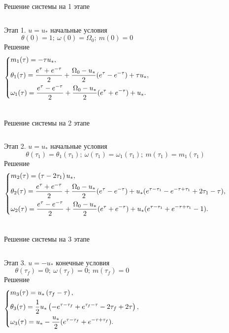 \documentclass[10pt]{beamer}
\begin{document}
\begin{frame}{Решение системы на 1 этапе}
	\begin{columns}
		Этап 1. $u=u_*$ начальные условия
		\[
			\theta(0)=1;\ \omega(0)=\Omega_0;\ m(0)=0
		\]
		Решение
		\[
			\left\{ {\begin{aligned}
						 & m_1(\tau) = -\tau  u_*, \hfill                                                                         \\
						 & \theta_1(\tau) = \frac{e^\tau+e^{-\tau}}{2}+\frac{\Omega_0-u_*}{2}(e^\tau-e^{-\tau})+\tau u_* , \hfill \\
						 & \omega_1(\tau) =\frac{e^\tau-e^{-\tau}}{2}+\frac{\Omega_0-u_*}{2}(e^\tau+e^{-\tau})+u_*   . \hfill     \\
					\end{aligned}} \right.
		\]
	\end{columns}
\end{frame}
\begin{frame}{Решение системы на 2 этапе}
	\begin{columns}
		\column{1\textwidth}
		Этап 2. $u=u_*$ начальные условия
		\[
			\theta(\tau_1)=\theta_1(\tau_1);\ \omega(\tau_1)=\omega_1(\tau_1);\ m(\tau_1)=m_1(\tau_1)
		\]
		Решение
		\[
			\left\{ {\begin{aligned}
						 & m_2(\tau) = \left(\tau -2 \tau _1\right) u_*, \hfill                                                                                                \\
						 & \theta_2(\tau) = \frac{e^\tau+e^{-\tau}}{2}+\frac{\Omega_0-u_\ast}{2}(e^\tau-e^{-\tau})+u_*(e^{\tau-\tau_1}-e^{-\tau+\tau_1}+2\tau_1-\tau) , \hfill \\
						 & \omega_2(\tau) = \frac{e^\tau-e^{-\tau}}{2}+\frac{\Omega_0-u_\ast}{2}(e^\tau+e^{-\tau})+u_*(e^{\tau-\tau_1}+e^{-\tau+\tau_1}-1) . \hfill            \\
					\end{aligned}} \right.
		\]
	\end{columns}
\end{frame}
\begin{frame}{Решение системы на 3 этапе}
	\begin{columns}
		Этап 3. $u=-u_*$ конечные условия
		\[
			\theta(\tau_f)=0;\ \omega(\tau_f)=0;\ m(\tau_f)=0
		\]
		Решение
		\[
			\left\{ {\begin{aligned}
						 & m_3(\tau) = u_* \left(\tau _f-\tau \right), \hfill                                           \\
						 & \theta_3(\tau) = \frac{1}{2} u_* \left(-e^{\tau -\tau _f}+e^{\tau _f-\tau }-2 \tau _f+2 \tau
						\right), \hfill                                                                                 \\
						 & \omega_3(\tau) =u_*-\frac{u_*}{2}(e^{\tau-\tau_f}+e^{-\tau+\tau_f}) . \hfill                 \\
					\end{aligned}} \right.
		\]
	\end{columns}
\end{frame}
\end{document}
